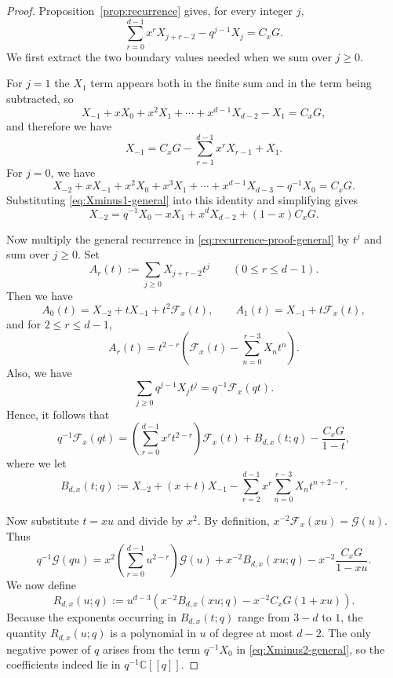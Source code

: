 \documentclass[12pt]{amsart}
\numberwithin{equation}{section}
\newcommand{\CC}{\mathbb C}
\begin{document}
\begin{proof}
    Proposition~\ref{prop:recurrence} gives, for every integer $j$,
\begin{equation}\label{eq:recurrence-proof-general}
\sum_{r=0}^{d-1}x^rX_{j+r-2}-q^{j-1}X_j=C_xG.
\end{equation}
We first extract the two boundary values needed when we sum over $j\geq 0$.

For $j=1$ the $X_1$ term appears both in the finite sum and in the term being subtracted, so
\[
X_{-1}+xX_0+x^2X_1+\cdots+x^{d-1}X_{d-2}-X_1=C_xG,
\]
and therefore we have
\begin{equation}\label{eq:Xminus1-general}
X_{-1}=C_xG-\sum_{r=1}^{d-1}x^rX_{r-1}+X_1.
\end{equation}
For $j=0$, we have
\[
X_{-2}+xX_{-1}+x^2X_0+x^3X_1+\cdots+x^{d-1}X_{d-3}-q^{-1}X_0=C_xG.
\]
Substituting \eqref{eq:Xminus1-general} into this identity and simplifying gives
\begin{equation}\label{eq:Xminus2-general}
X_{-2}=q^{-1}X_0-xX_1+x^dX_{d-2}+(1-x)C_xG.
\end{equation}

Now multiply the general recurrence in \eqref{eq:recurrence-proof-general} by $t^j$ and sum over $j\geq 0$.  Set
\[
A_r(t):=\sum_{j\geq 0} X_{j+r-2}t^j
\qquad (0\leq r\leq d-1).
\]
Then we have
\[
A_0(t)=X_{-2}+tX_{-1}+t^2\mathcal F_x(t),
\qquad
A_1(t)=X_{-1}+t\mathcal F_x(t),
\]
and for $2\leq r\leq d-1$,
\[
A_r(t)=t^{2-r}\left(\mathcal F_x(t)-\sum_{n=0}^{r-3}X_nt^n\right).
\]
Also, we have
\[
\sum_{j\geq 0} q^{j-1}X_jt^j=q^{-1}\mathcal F_x(qt).
\]
Hence, it follows that
\[
q^{-1}\mathcal F_x(qt)
=
\left(\sum_{r=0}^{d-1}x^rt^{2-r}\right)\mathcal F_x(t)
+
B_{d,x}(t;q)
-
\frac{C_xG}{1-t},
\]
where we let
\begin{equation}\label{eq:Bdx-general}
B_{d,x}(t;q)
:=
X_{-2}+(x+t)X_{-1}-\sum_{r=2}^{d-1}x^r\sum_{n=0}^{r-3}X_n t^{n+2-r}.
\end{equation}

Now substitute $t=xu$ and divide by $x^2$.  By definition, $x^{-2}\mathcal F_x(xu)=\mathcal G(u)$.  Thus
\begin{equation}\label{eq:G-intermediate-general}
q^{-1}\mathcal G(qu)
=
x^2\left(\sum_{r=0}^{d-1}u^{2-r}\right)\mathcal G(u)
+
x^{-2}B_{d,x}(xu;q)-x^{-2}\frac{C_xG}{1-xu}.
\end{equation}
We now define
\begin{equation}\label{eq:def-R-general}
R_{d,x}(u;q)
:=
 u^{d-3}\left(x^{-2}B_{d,x}(xu;q)-x^{-2}C_xG(1+xu)\right).
\end{equation}
Because the exponents occurring in $B_{d,x}(t;q)$ range from $3-d$ to $1$, the quantity $R_{d,x}(u;q)$ is a polynomial in $u$ of degree at most $d-2$.  The only negative power of $q$ arises from the term $q^{-1}X_0$ in \eqref{eq:Xminus2-general}, so the coefficients indeed lie in $q^{-1}\CC[[q]]$.


\end{proof}
\end{document}
